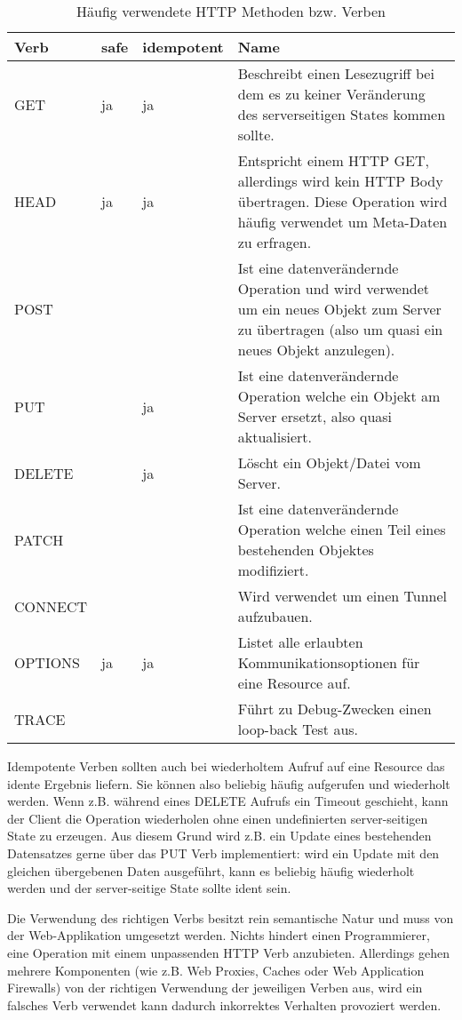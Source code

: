\begin{table}
	\begin{center}
\begin{tabular}{lllp{9.5cm}}
	\toprule
	Verb & safe & idempotent & Name\\
	\midrule
	GET  & ja & ja & Beschreibt einen Lesezugriff bei dem es zu keiner Veränderung des serverseitigen States kommen sollte. \\
	HEAD & ja & ja &  Entspricht einem HTTP GET, allerdings wird kein HTTP Body übertragen. Diese Operation wird häufig verwendet um Meta-Daten zu erfragen.\\
	POST &    &    & Ist eine datenverändernde Operation und wird verwendet um ein neues Objekt zum Server zu übertragen (also um quasi ein neues Objekt anzulegen).\\
	PUT  &    & ja & Ist eine datenverändernde Operation welche ein Objekt am Server ersetzt, also quasi aktualisiert. \\
	DELETE &  & ja & Löscht ein Objekt/Datei vom Server. \\
	PATCH &   &    & Ist eine datenverändernde Operation welche einen Teil eines bestehenden Objektes modifiziert. \\
	CONNECT & &    & Wird verwendet um einen Tunnel aufzubauen. \\
	OPTIONS & ja & ja & Listet alle erlaubten Kommunikationsoptionen für eine Resource auf. \\
	TRACE &   &    & Führt zu Debug-Zwecken einen loop-back Test aus. \\
	\bottomrule
\end{tabular}
	\caption{Häufig verwendete HTTP Methoden bzw. Verben}
	\label{tbl:http_verbs}
\end{center}
\end{table}

Idempotente Verben sollten auch bei wiederholtem Aufruf auf eine Resource das idente Ergebnis liefern. Sie können also beliebig häufig aufgerufen und wiederholt werden. Wenn z.B. während eines DELETE Aufrufs ein Timeout geschieht, kann der Client die Operation wiederholen ohne einen undefinierten server-seitigen State zu erzeugen. Aus diesem Grund wird z.B. ein Update eines bestehenden Datensatzes gerne über das PUT Verb implementiert: wird ein Update mit den gleichen übergebenen Daten ausgeführt, kann es beliebig häufig wiederholt werden und der server-seitige State sollte ident sein.

Die Verwendung des richtigen Verbs besitzt rein semantische Natur und muss von der Web-Applikation umgesetzt werden. Nichts hindert einen Programmierer, eine Operation mit einem unpassenden HTTP Verb anzubieten. Allerdings gehen mehrere Komponenten (wie z.B. Web Proxies, Caches oder Web Application Firewalls) von der richtigen Verwendung der jeweiligen Verben aus, wird ein falsches Verb verwendet kann dadurch inkorrektes Verhalten provoziert werden.

